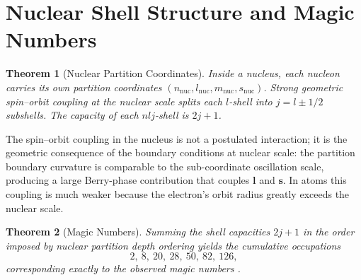 \documentclass[11pt,a4paper]{article}
\newtheorem{theorem}{Theorem}[section]
\theoremstyle{definition}
\theoremstyle{remark}
\begin{document}
\section{Nuclear Shell Structure and Magic Numbers}
\label{sec:magic}

\begin{theorem}[Nuclear Partition Coordinates]
\label{thm:nucpart}
Inside a nucleus, each nucleon carries its own partition coordinates $(n_\mathrm{nuc}, l_\mathrm{nuc}, m_\mathrm{nuc}, s_\mathrm{nuc})$. Strong geometric spin--orbit coupling at the nuclear scale splits each $l$-shell into $j = l\pm 1/2$ subshells. The capacity of each $nlj$-shell is $2j+1$.
\end{theorem}

The spin--orbit coupling in the nucleus is not a postulated interaction; it is the geometric consequence of the boundary conditions at nuclear scale: the partition boundary curvature is comparable to the sub-coordinate oscillation scale, producing a large Berry-phase contribution that couples $\mathbf{l}$ and $\mathbf{s}$. In atoms this coupling is much weaker because the electron's orbit radius greatly exceeds the nuclear scale.

\begin{theorem}[Magic Numbers]
\label{thm:magic}
Summing the shell capacities $2j+1$ in the order imposed by nuclear partition depth ordering yields the cumulative occupations
\[
2,\ 8,\ 20,\ 28,\ 50,\ 82,\ 126,
\]
corresponding exactly to the observed magic numbers \citep{mayer1949, jensen1950, mayerjensen1955}.
\end{theorem}
\end{document}
